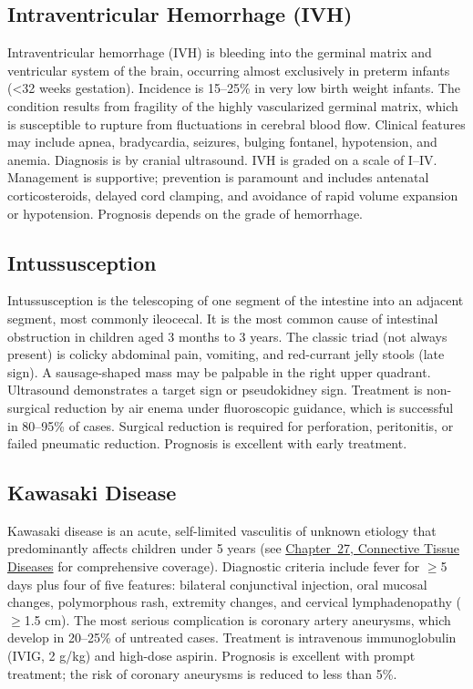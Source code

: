 \subsection{Intraventricular Hemorrhage (IVH)}
\label{sec:Intraventricular Hemorrhage}
Intraventricular hemorrhage (IVH) is bleeding into the germinal matrix and ventricular system of the brain, occurring almost exclusively in preterm infants (<32 weeks gestation). Incidence is 15--25\% in very low birth weight infants. The condition results from fragility of the highly vascularized germinal matrix, which is susceptible to rupture from fluctuations in cerebral blood flow. Clinical features may include apnea, bradycardia, seizures, bulging fontanel, hypotension, and anemia. Diagnosis is by cranial ultrasound. IVH is graded on a scale of I--IV. Management is supportive; prevention is paramount and includes antenatal corticosteroids, delayed cord clamping, and avoidance of rapid volume expansion or hypotension. Prognosis depends on the grade of hemorrhage.

\subsection{Intussusception}
\label{sec:Intussusception}
Intussusception is the telescoping of one segment of the intestine into an adjacent segment, most commonly ileocecal. It is the most common cause of intestinal obstruction in children aged 3 months to 3 years. The classic triad (not always present) is colicky abdominal pain, vomiting, and red-currant jelly stools (late sign). A sausage-shaped mass may be palpable in the right upper quadrant. Ultrasound demonstrates a target sign or pseudokidney sign. Treatment is non-surgical reduction by air enema under fluoroscopic guidance, which is successful in 80--95\% of cases. Surgical reduction is required for perforation, peritonitis, or failed pneumatic reduction. Prognosis is excellent with early treatment.

\subsection{Kawasaki Disease}
\label{sec:pediatric:Kawasaki Disease}
Kawasaki disease is an acute, self-limited vasculitis of unknown etiology that predominantly affects children under 5 years (see \hyperref[ch:connective_tissue]{Chapter~27, Connective Tissue Diseases} for comprehensive coverage). Diagnostic criteria include fever for $\ge$5 days plus four of five features: bilateral conjunctival injection, oral mucosal changes, polymorphous rash, extremity changes, and cervical lymphadenopathy ($\ge$1.5 cm). The most serious complication is coronary artery aneurysms, which develop in 20--25\% of untreated cases. Treatment is intravenous immunoglobulin (IVIG, 2 g/kg) and high-dose aspirin. Prognosis is excellent with prompt treatment; the risk of coronary aneurysms is reduced to less than 5\%.

